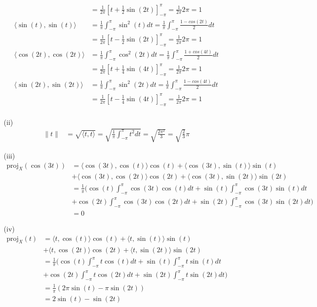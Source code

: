 \documentclass[letterpaper,12pt]{article}
\theoremstyle{definition}
\begin{document}
\begin{enumerate}
\begin{enumerate}
\begin{align*}
              &= \frac{1}{2\pi} [t + \frac{1}{2}\sin(2t)]_{-\pi}^\pi = \frac{1}{2\pi}2\pi = 1 \\
              \langle \sin(t), \sin(t) \rangle &= \frac{1}{\pi}\int_{-\pi}^\pi \sin^2(t)dt = \frac{1}{\pi}\int_{-\pi}^\pi \frac{1 - cos(2t)}{2}dt \\
              &= \frac{1}{2\pi} [t - \frac{1}{2}\sin(2t)]_{-\pi}^\pi = \frac{1}{2\pi}2\pi = 1 \\
              \langle \cos(2t), \cos(2t) \rangle &= \frac{1}{\pi}\int_{-\pi}^\pi \cos^2(2t)dt = \frac{1}{\pi}\int_{-\pi}^\pi \frac{1 + cos(4t)}{2}dt \\
              &= \frac{1}{2\pi} [t + \frac{1}{4}\sin(4t)]_{-\pi}^\pi = \frac{1}{2\pi}2\pi = 1 \\
              \langle \sin(2t), \sin(2t) \rangle &= \frac{1}{\pi}\int_{-\pi}^\pi \sin^2(2t)dt = \frac{1}{\pi}\int_{-\pi}^\pi \frac{1 - cos(4t)}{2}dt \\
              &= \frac{1}{2\pi} [t - \frac{1}{4}\sin(4t)]_{-\pi}^\pi = \frac{1}{2\pi}2\pi = 1 \\
          \end{align*}
        \item[(ii)]
          \begin{align*}
            \|t\| &= \sqrt{\langle t,t \rangle} = \sqrt{\frac{1}{\pi}\int_{-\pi}^\pi t^2 dt} = \sqrt{\frac{2\pi^2}{3}} = \sqrt{\frac{2}{3}}\pi
          \end{align*}
        \item[(iii)]
          \begin{align*}
            \text{proj}_X(\cos(3t)) &= \langle \cos(3t), \cos(t) \rangle \cos(t) + \langle \cos(3t), \sin(t) \rangle \sin(t) \\
            &+ \langle \cos(3t), \cos(2t) \rangle \cos(2t) + \langle \cos(3t), \sin(2t) \rangle \sin(2t) \\
            &= \frac{1}{\pi}(\cos(t)\int_{-\pi}^\pi \cos(3t)\cos(t) dt + \sin(t)\int_{-\pi}^\pi \cos(3t)\sin(t) dt  \\
            &+ \cos(2t)\int_{-\pi}^\pi \cos(3t)\cos(2t) dt + \sin(2t)\int_{-\pi}^\pi \cos(3t)\sin(2t)dt) \\
            &= 0
          \end{align*}
        \item[(iv)]
          \begin{align*}
            \text{proj}_X(t) &= \langle t, \cos(t) \rangle \cos(t) + \langle t, \sin(t) \rangle \sin(t) \\
            &+ \langle t, \cos(2t) \rangle \cos(2t) + \langle t, \sin(2t) \rangle \sin(2t) \\
            &= \frac{1}{\pi}(\cos(t)\int_{-\pi}^\pi t\cos(t) dt + \sin(t)\int_{-\pi}^\pi t\sin(t) dt  \\
            &+ \cos(2t)\int_{-\pi}^\pi t\cos(2t) dt + \sin(2t)\int_{-\pi}^\pi t\sin(2t)dt) \\
            &= \frac{1}{\pi}(2\pi\sin(t) - \pi\sin(2t))\\
            &= 2\sin(t) - \sin(2t)
          \end{align*}
      \end{enumerate}


\end{enumerate}
\end{document}
